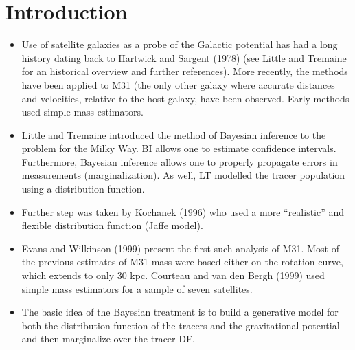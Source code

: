 \documentclass[preprint,12pt]{aastex}
\begin{document}



\section{Introduction}

\begin{itemize}

\item Use of satellite galaxies as a probe of the Galactic potential
has had a long history dating back to Hartwick and Sargent (1978) (see
Little and Tremaine for an historical overview and further
references).  More recently, the methods have been applied to M31 (the
only other galaxy where accurate distances and velocities, relative to
the host galaxy, have been observed.  Early methods used simple mass
estimators.

\item Little and Tremaine introduced the method of Bayesian inference
to the problem for the Milky Way.  BI allows one to estimate
confidence intervals.  Furthermore, Bayesian inference allows one to
properly propagate errors in measurements (marginalization).  As well,
LT modelled the tracer population using a distribution function.

\item Further step was taken by Kochanek (1996) who used a more ``realistic''
and flexible distribution function (Jaffe model).

\item Evans and Wilkinson (1999) present the first such analysis of
M31.  Most of the previous estimates of M31 mass were based either on
the rotation curve, which extends to only 30 kpc.  Courteau and van
den Bergh (1999) used simple mass estimators for a sample of seven
satellites.

\item The basic idea of the Bayesian treatment is to build a
generative model for both the distribution function of the tracers and
the gravitational potential and then marginalize over the tracer DF.

\end{itemize}

%
%
\end{document}
